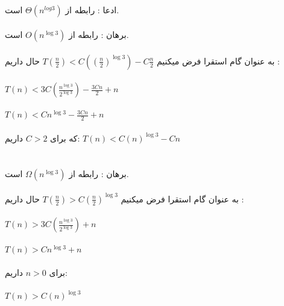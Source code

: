 \\
\subproblem{}
ادعا : رابطه از $\Theta(n^{log3})$ است.\\\\
برهان : رابطه از $O(n^{\log3})$ است. \\\\
به عنوان گام استقرا فرض میکنیم $T(\frac{n}{2}) < C ((\frac{n}{2})^{\log3})-C\frac{n}{2}$ حال داریم : \\\\
$T(n) < 3C (\frac{n^{\log3}}{2^{\log3}}) -\frac{3Cn}{2}  + n$\\\\
$T(n) < Cn^{\log3} -\frac{3Cn}{2} + n$ \\\\
که برای $C>2$ داریم:
$T(n) < C(n)^{\log3} - Cn$\\\\\\

برهان : رابطه از $\Omega(n^{\log3})$ است. \\\\
به عنوان گام استقرا فرض میکنیم $T(\frac{n}{2}) > C (\frac{n}{2})^{\log3}$ حال داریم : \\\\
$T(n) > 3C (\frac{n^{\log3}}{2^{\log3}}) + n$\\\\
$T(n) > Cn^{\log3} + n$\\\\
 برای $n>0$ داریم: \\\\
$T(n) > C(n)^{\log3}$\\\\\\\\